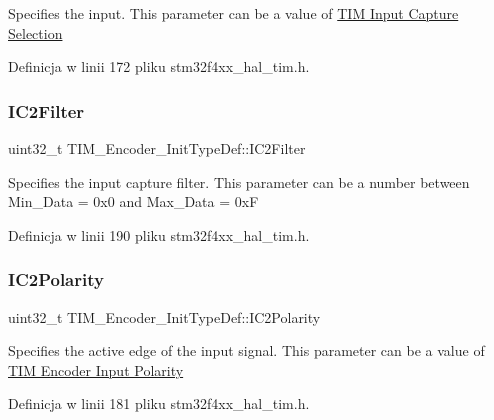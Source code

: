 Specifies the input. This parameter can be a value of \hyperlink{group___t_i_m___input___capture___selection}{T\+IM Input Capture Selection} 

Definicja w linii 172 pliku stm32f4xx\+\_\+hal\+\_\+tim.\+h.

\mbox{\label{struct_t_i_m___encoder___init_type_def_a30cdb580735007aa9735b2f5cc133049}} 
\subsubsection{\texorpdfstring{I\+C2\+Filter}{IC2Filter}}
{\footnotesize\ttfamily uint32\+\_\+t T\+I\+M\+\_\+\+Encoder\+\_\+\+Init\+Type\+Def\+::\+I\+C2\+Filter}

Specifies the input capture filter. This parameter can be a number between Min\+\_\+\+Data = 0x0 and Max\+\_\+\+Data = 0xF 

Definicja w linii 190 pliku stm32f4xx\+\_\+hal\+\_\+tim.\+h.

\mbox{\label{struct_t_i_m___encoder___init_type_def_abb7968a8ba34e13da1fb8f5916a754ce}} 
\subsubsection{\texorpdfstring{I\+C2\+Polarity}{IC2Polarity}}
{\footnotesize\ttfamily uint32\+\_\+t T\+I\+M\+\_\+\+Encoder\+\_\+\+Init\+Type\+Def\+::\+I\+C2\+Polarity}

Specifies the active edge of the input signal. This parameter can be a value of \hyperlink{group___t_i_m___encoder___input___polarity}{T\+IM Encoder Input Polarity} 

Definicja w linii 181 pliku stm32f4xx\+\_\+hal\+\_\+tim.\+h.

\mbox{\label{struct_t_i_m___encoder___init_type_def_ac80972d0e157508ff075815da58070cb}} 
